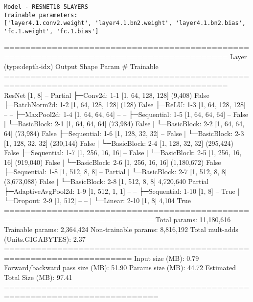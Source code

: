 \newpage
\EN
\centering %
\begin{verbatim}
Model - RESNET18_5LAYERS
Trainable parameters: 
['layer4.1.conv2.weight', 'layer4.1.bn2.weight', 'layer4.1.bn2.bias', 
'fc.1.weight', 'fc.1.bias']
\end{verbatim}

\begin{minipage}{\linewidth} %
\begin{CodeBlock}
========================================================================================
Layer (type:depth-idx)           Output Shape              Param #           Trainable
========================================================================================
ResNet                           [1, 8]                    --                Partial
├─Conv2d: 1-1                    [1, 64, 128, 128]         (9,408)           False
├─BatchNorm2d: 1-2               [1, 64, 128, 128]         (128)             False
├─ReLU: 1-3                      [1, 64, 128, 128]         --                --
├─MaxPool2d: 1-4                 [1, 64, 64, 64]           --                --
├─Sequential: 1-5                [1, 64, 64, 64]           --                False
|    └─BasicBlock: 2-1           [1, 64, 64, 64]           (73,984)          False
|    └─BasicBlock: 2-2           [1, 64, 64, 64]           (73,984)          False
├─Sequential: 1-6                [1, 128, 32, 32]          --                False
|    └─BasicBlock: 2-3           [1, 128, 32, 32]          (230,144)         False
|    └─BasicBlock: 2-4           [1, 128, 32, 32]          (295,424)         False
├─Sequential: 1-7                [1, 256, 16, 16]          --                False
|    └─BasicBlock: 2-5           [1, 256, 16, 16]          (919,040)         False
|    └─BasicBlock: 2-6           [1, 256, 16, 16]          (1,180,672)       False
├─Sequential: 1-8                [1, 512, 8, 8]            --                Partial
|    └─BasicBlock: 2-7           [1, 512, 8, 8]            (3,673,088)       False
|    └─BasicBlock: 2-8           [1, 512, 8, 8]            4,720,640         Partial
├─AdaptiveAvgPool2d: 1-9         [1, 512, 1, 1]            --                --
├─Sequential: 1-10               [1, 8]                    --                True
|    └─Dropout: 2-9              [1, 512]                  --                --
|    └─Linear: 2-10              [1, 8]                    4,104             True
==========================================================================
Total params: 11,180,616
Trainable params: 2,364,424
Non-trainable params: 8,816,192
Total mult-adds (Units.GIGABYTES): 2.37
======================================================================
Input size (MB): 0.79
Forward/backward pass size (MB): 51.90
Params size (MB): 44.72
Estimated Total Size (MB): 97.41
===========================================================================
\end{CodeBlock}
\end{minipage}
\HE
